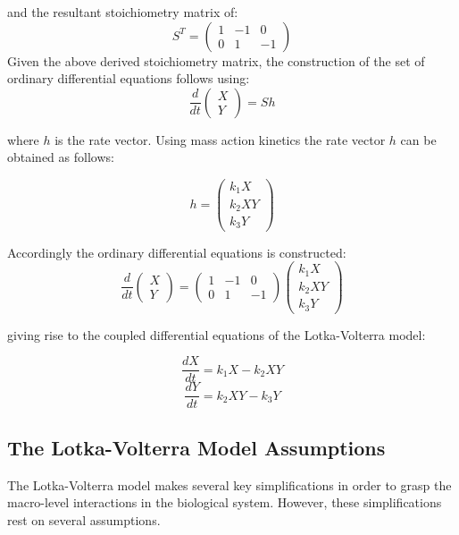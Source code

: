 \documentclass{article}
\begin{document}
and the resultant stoichiometry matrix of:
\begin{equation}
    S^T = \begin{pmatrix}1 & -1 & 0\\0 & 1 & -1 \end{pmatrix}
\end{equation}
Given the above derived stoichiometry matrix, the construction of the set of ordinary differential equations follows using: 
\begin{equation}
    \frac{d}{dt} \begin{pmatrix}X\\Y \end{pmatrix} = Sh
\end{equation}

where $h$ is the rate vector. Using mass action kinetics the rate vector $h$ can be obtained as follows: 

\begin{equation}
    h = \begin{pmatrix}k_1X\\k_2XY\\k_3Y \end{pmatrix}
\end{equation}

Accordingly the ordinary differential equations is constructed: 
\begin{equation}
    \frac{d}{dt} \begin{pmatrix}X\\Y \end{pmatrix} = \begin{pmatrix}1 & -1 & 0\\0 & 1 & -1 \end{pmatrix} \begin{pmatrix}k_1X\\k_2XY\\k_3Y \end{pmatrix}
\end{equation}

giving rise to the coupled differential equations of the Lotka-Volterra model:

\begin{equation}
    \frac{dX}{dt} = k_1X - k_2XY
\end{equation}
\begin{equation}
    \frac{dY}{dt} = k_2XY - k_3Y
\end{equation}

\subsection{The Lotka-Volterra Model Assumptions}\label{assume}
The Lotka-Volterra model makes several key simplifications in order to grasp the macro-level interactions in the biological system. However, these simplifications rest on several assumptions. 
\end{document}
